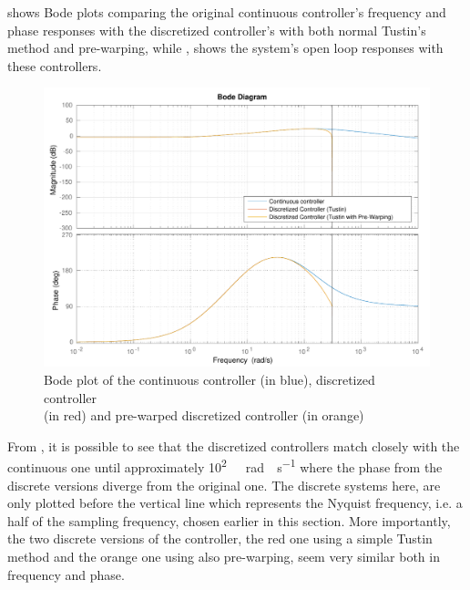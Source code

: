  shows Bode plots comparing the original continuous controller's frequency and phase responses with the discretized controller's with both normal Tustin's method and pre-warping, while , shows the system's open loop responses with these controllers.\\ 
% 
\begin{figure}[H]
  \centering
  \includegraphics[scale=0.6]{figures/prewarpVsNoPrewarpVsContinuousBode.pdf}
  \caption{Bode plot of the continuous controller (in blue), discretized controller\\(in red) and pre-warped discretized controller (in orange)}
  \label{fig:bodePrewarpVsNoPrewarpVsContinuous}
\end{figure}
%
From , it is possible to see that the discretized controllers match closely with the continuous one until approximately \si{10^{2}\ rad \cdot s^{-1}} where the phase from the discrete versions diverge from the original one. The discrete systems here, are only plotted before the vertical line which represents the Nyquist frequency, i.e. a half of the sampling frequency, chosen earlier in this section. More importantly, the two discrete versions of the controller, the red one using a simple Tustin method and the orange one using also pre-warping, seem very similar both in frequency and phase.
%
